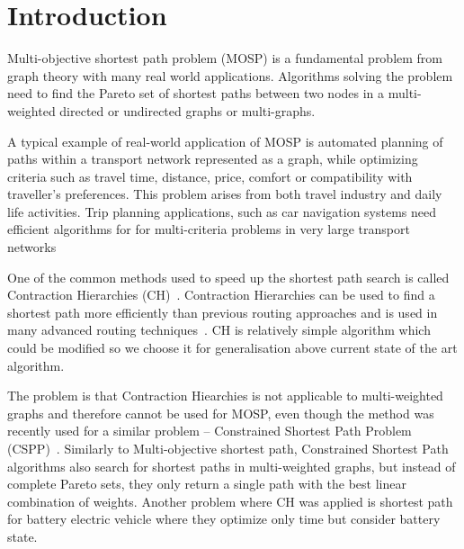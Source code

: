 % 
%  
%  
%  

\section{Introduction} \label{secIntroduction}

Multi-objective shortest path problem (MOSP) is a fundamental problem from
graph theory with many real world applications. Algorithms solving the problem
need to find the Pareto set of shortest paths between two nodes in a
multi-weighted directed or undirected graphs or multi-graphs. 

A typical example of real-world application of MOSP is automated planning of
paths within a transport network represented as a graph, while optimizing
criteria such as travel time, distance, price, comfort or compatibility with
traveller's preferences. This problem arises from both travel industry and
daily life activities. Trip planning applications, such as car navigation
systems need efficient algorithms for for multi-criteria problems in very large
transport 
networks~\cite{duque2015exact}



One of the common methods used to speed up the shortest path search  is called
Contraction Hierarchies (CH)~\cite{geisberger2008contraction}. Contraction
Hierarchies can be used to find a shortest path more efficiently than previous
routing approaches and is used in many advanced routing
techniques~\cite{delling2009engineering}.  CH is relatively simple algorithm
which could be modified so we choose it for generalisation above current state
of the art algorithm.

The problem is that Contraction Hiearchies is not applicable to multi-weighted
graphs and therefore cannot be used for MOSP, even though the method was
recently used for a similar problem -- Constrained Shortest Path Problem
(CSPP)~\cite{pugliese2013survey,funke2013polynomial}. Similarly to
Multi-objective shortest path, Constrained Shortest Path algorithms also search
for shortest paths in multi-weighted graphs, but instead of complete Pareto
sets, they only return a single path with the best linear combination of
weights. Another problem where CH was applied is shortest path for
battery electric vehicle \cite{artmeier2010shortest} where they optimize only
time but consider battery state. 

